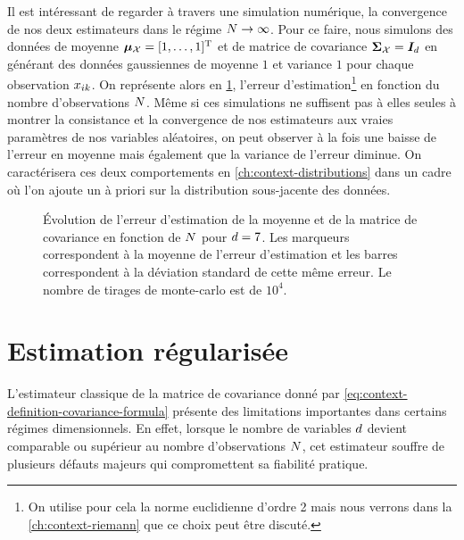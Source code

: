 Il est intéressant de regarder à travers une simulation numérique, la convergence de nos deux estimateurs dans le régime $N\to\infty$. Pour ce faire, nous simulons des données de moyenne $\boldsymbol{\mu}_{\mathcal{X}} = [1,\dots,1]^{\mathrm{T}}$ et de matrice de covariance $\boldsymbol{\Sigma}_{\mathcal{X}}=\boldsymbol{I}_{d}$ en générant des données gaussiennes de moyenne $1$ et variance $1$ pour chaque observation $x_{ik}$. On représente alors en \cref{fig:context-estimation-errorscm}, l'erreur d'estimation\footnote{On utilise pour cela la norme euclidienne d'ordre 2 mais nous verrons dans la \cref{ch:context-riemann} que ce choix peut être discuté.} en fonction du nombre d'observations $N$. Même si ces simulations ne suffisent pas à elles seules à montrer la consistance et la convergence de nos estimateurs aux vraies paramètres de nos variables aléatoires, on peut observer à la fois une baisse de l'erreur en moyenne mais également que la variance de l'erreur diminue. On caractérisera ces deux comportements en \cref{ch:context-distributions} dans un cadre où l'on ajoute un à priori sur la distribution sous-jacente des données.

\begin{figure}[h]
    \begin{center}
    
    
  \end{center}
  \provScmmeanQR[.5cm]
    \caption{\'Evolution de l'erreur d'estimation de la moyenne et de la matrice de covariance en fonction de $N$ pour $d=7$. Les marqueurs correspondent à la moyenne de l'erreur d'estimation et les barres correspondent à la déviation standard de cette même erreur. Le nombre de tirages de monte-carlo est de $ 10^4$. \provScmcov}
  \label{fig:context-estimation-errorscm}
\end{figure}



\section{Estimation régularisée}
\label{sec:context-covariance-regularized-estimation}

  


L'estimateur classique de la matrice de covariance donné par \cref{eq:context-definition-covariance-formula} présente des limitations importantes dans certains régimes dimensionnels. En effet, lorsque le nombre de variables $d$ devient comparable ou supérieur au nombre d'observations $N$, cet estimateur souffre de plusieurs défauts majeurs qui compromettent sa fiabilité pratique.

